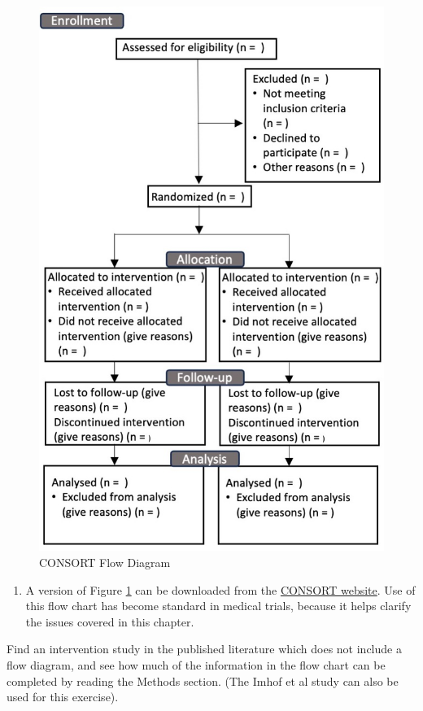 \documentclass{krantz}
\providecommand{\tightlist}{%
\setlength{\itemsep}{0pt}\setlength{\parskip}{0pt}}
\begin{document}
\begin{figure}
\includegraphics[width=0.9\linewidth]{images_bw/consort} \caption{CONSORT Flow Diagram}\label{fig:consortfig}
\end{figure}

\begin{enumerate}
\def\labelenumi{\arabic{enumi}.}
\setcounter{enumi}{1}
\tightlist
\item
  A version of Figure \ref{fig:consortfig} can be downloaded from the \href{http://www.consort-statement.org/consort-statement/flow-diagram}{CONSORT website}. Use of this flow chart has become standard in medical trials, because it helps clarify the issues covered in this chapter.
\end{enumerate}

Find an intervention study in the published literature which does not include a flow diagram, and see how much of the information in the flow chart can be completed by reading the Methods section. (The Imhof et al study can also be used for this exercise).
\end{document}
